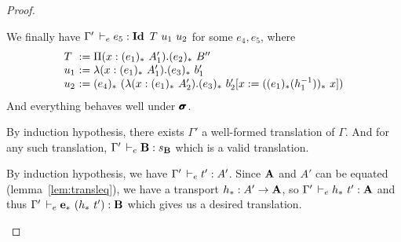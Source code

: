 \documentclass[a4paper,english]{lipics-utf8x}
\begin{document}
\begin{proof}
\begin{caselist}
      We finally have
      $\Gamma' \,\vdash_e e_5 : \operatorname{\mathbf{Id}~} T\ u_1\ u_2$ for some $e_4,e_5$,
      where
      \[
        \begin{array}{l@{~}l}
          T   &:= \Pi (x : (e_1)_*\ A'_1). (e_2)_*\ B'' \\
          u_1 &:= \lambda (x : (e_1)_*\ A'_1). (e_3)_*\ b'_1 \\
          u_2 &:= (e_4)_*\ %
                   (\lambda (x : (e_1)_*\ A'_2).
                    (e_3)_*\ b'_2[x := ((e_1)_* (h_1\inv))_*\ x])
        \end{array}
      \]
      And everything behaves well under $\operatorname{\pmb{\bm{\sigma}}}$.

      \nextcase
      \begin{mathc}
        \ru{\derr \Gamma
          }{\Gamma \derr \mR : \sB}
      \end{mathc}
      By induction hypothesis, there exists $\Gamma'$ a well-formed translation
      of $\Gamma$. And for any such translation, $\Gamma' \,\vdash_e \operatorname{\mathbf{B}} : s_{\operatorname{\mathbf{B}}}$
      which is a valid translation.

      \nextcase
      \begin{mathc}
      \end{mathc}
      By induction hypothesis, we have $\Gamma' \,\vdash_e t' : A'$.
      Since $\operatorname{\mathbf{A}}$ and $A'$ can be equated (lemma~\ref{lem:transleq}),
      we have a transport $h_* : A' \to \operatorname{\mathbf{A}}$, so
      $\Gamma' \,\vdash_e h_*\ t' : \operatorname{\mathbf{A}}$ and thus
      $\Gamma' \,\vdash_e \operatorname{\mathbf{e}}_*\ (h_*\ t') : \operatorname{\mathbf{B}}$ which gives us a desired
      translation.
    \end{caselist}
  \end{proof}
\end{document}
